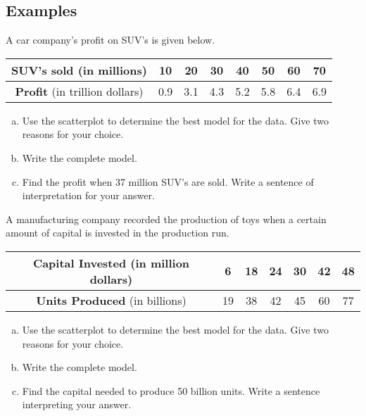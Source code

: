 \documentclass[notes]{subfiles}
\begin{document}
	\subsection*{Examples}
		\begin{ex} A car company's profit on SUV's is given below.  
			\begin{center}
				{\renewcommand{\arraystretch}{1.2}
				\begin{tabular}{|c||c|c|c|c|c|c|c|}\hline
					\textbf{SUV's sold} (in millions) & 10 & 20 & 30 & 40 & 50 & 60 & 70\\ \hline
					\textbf{Profit} (in trillion dollars) & 0.9 & 3.1 & 4.3 & 5.2 & 5.8 & 6.4 & 6.9\\ \hline 
				\end{tabular}		
				}
			\end{center}
			\begin{enumerate}[(a)]
				\item Use the scatterplot to determine the best model for the data.  Give two reasons for your choice.
				\item Write the complete model.
				\item Find the profit when 37 million SUV's are sold.  Write a sentence of interpretation for your answer.
			\end{enumerate}
		\end{ex}
			\newpage

		\begin{ex} A manufacturing company recorded the production of toys when a certain amount of capital is invested in the production run.
			\begin{center}
				{\renewcommand{\arraystretch}{1.2}
				\begin{tabular}{|c||c|c|c|c|c|c|}\hline
					\textbf{Capital Invested} (in  million dollars) & 6 & 18 & 24 & 30 & 42 & 48\\ \hline
					\textbf{Units Produced} (in billions)& 19 & 38 & 42 & 45 & 60 & 77\\ \hline 
				\end{tabular}
				}
			\end{center}
			\begin{enumerate}[(a)]
				\item Use the scatterplot to determine the best model for the data.  Give two reasons for your choice.
				\item Write the complete model.
				\item Find the capital needed to produce 50 billion units.  Write a sentence interpreting your answer.
			\end{enumerate}
		\end{ex}
	\clearpage
\end{document}
